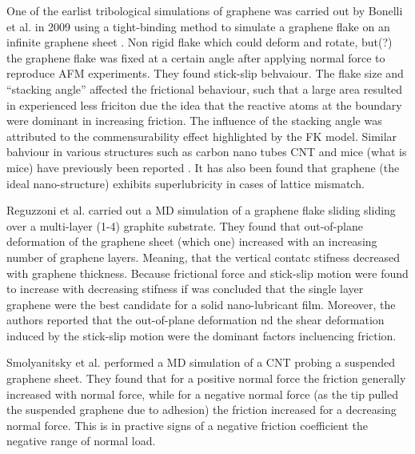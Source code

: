 One of the earlist tribological simulations of
graphene was carried out by Bonelli et al. \cite{bonelli_atomistic_2009} in 2009 using a
tight-binding method to simulate a graphene flake on an infinite graphene sheet \cite{penkov_tribology_2014}.
Non rigid flake which could deform and rotate, but(?) the graphene flake was
fixed at a certain angle after applying normal force to reproduce \acrshort{AFM}
experiments. They found stick-slip behvaiour. The flake size and ``stacking
angle'' affected the frictional behaviour, such that a large area resulted in
experienced less friciton due the idea that the reactive atoms at the boundary
were dominant in increasing friction. The influence of the stacking angle was
attributed to the commensurability effect highlighted by the \acrshort{FK}
model. Similar bahviour in various structures such as carbon nano tubes CNT and
mice (what is mice) have previously been reported
\cite[41-42]{penkov_tribology_2014}. It has also been found that graphene (the
ideal nano-structure) exhibits superlubricity in cases of lattice mismatch.

Reguzzoni et al. \cite[33]{penkov_tribology_2014} carried out a MD simulation of a graphene flake sliding sliding over a multi-layer (1-4) graphite substrate. They found that out-of-plane deformation of the graphene sheet (which one) increased with an increasing number of graphene layers. Meaning, that the vertical contatc stifness decreased with graphene thickness. Because frictional force and stick-slip motion were found to increase with decreasing stifness if was concluded that the single layer graphene were the best candidate for a solid nano-lubricant film. Moreover, the authors reported that the out-of-plane deformation nd the shear deformation induced by the stick-slip motion were the dominant factors incluencing friction.  


Smolyanitsky et al. \cite[34]{penkov_tribology_2014} performed a \acrshort{MD} simulation of a CNT probing a suspended graphene sheet. They found that for a positive normal force the friction generally increased with normal force, while for a negative normal force (as the tip pulled the suspended graphene due to adhesion) the friction increased for a decreasing normal force. This is in practive signs of a negative friction coefficient the negative range of normal load.  










